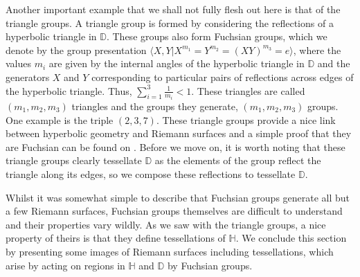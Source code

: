 \documentclass[11pt]{report}
\theoremstyle{definition}
\begin{document}
Another important example that we shall not fully flesh out here is that of the triangle groups. A triangle group is formed by considering the reflections of a hyperbolic triangle in $\mathbb{D}$. These groups also form Fuchsian groups, which we denote by the group presentation $\langle X,Y \vert X^{m_1}=Y^{m_2} = (XY)^{m_3} = e\rangle$, where the values $m_i$ are given by the internal angles of the hyperbolic triangle in $\mathbb{D}$ and the generators $X$ and $Y$ corresponding to particular pairs of reflections across edges of the hyperbolic triangle. Thus, $\sum\limits_{i=1}^3\frac{1}{m_i} < 1$. These triangles are called $(m_1,m_2,m_3)$ triangles and the groups they generate, $(m_1,m_2,m_3)$ groups. One example is the triple $(2,3,7)$. These triangle groups provide a nice link between hyperbolic geometry and Riemann surfaces and a simple proof that they are Fuchsian can be found on \cite[p.237]{comfun}. Before we move on, it is worth noting that these triangle groups clearly tessellate $\mathbb{D}$ as the elements of the group reflect the triangle along its edges, so we compose these reflections to tessellate $\mathbb{D}$.

Whilst it was somewhat simple to describe that Fuchsian groups generate all but a few Riemann surfaces, Fuchsian groups themselves are difficult to understand and their properties vary wildly. As we saw with the triangle groups, a nice property of theirs is that they define tessellations of $\mathbb{H}$. We conclude this section by presenting some images of Riemann surfaces including tessellations, which arise by acting on regions in $\mathbb{H}$ and $\mathbb{D}$ by Fuchsian groups. 
\end{document}
